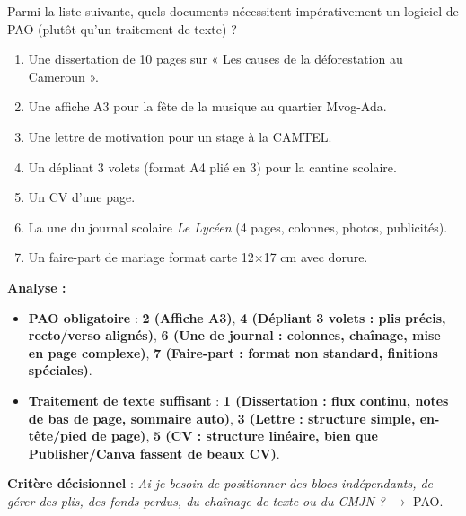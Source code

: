 \documentclass[11pt]{article}
\begin{document}
\begin{exemplebox}
Parmi la liste suivante, quels documents nécessitent impérativement un logiciel de PAO (plutôt qu'un traitement de texte) ?
\begin{enumerate}
    \item Une dissertation de 10 pages sur « Les causes de la déforestation au Cameroun ».
    \item Une affiche A3 pour la fête de la musique au quartier Mvog-Ada.
    \item Une lettre de motivation pour un stage à la CAMTEL.
    \item Un dépliant 3 volets (format A4 plié en 3) pour la cantine scolaire.
    \item Un CV d'une page.
    \item La une du journal scolaire \emph{Le Lycéen} (4 pages, colonnes, photos, publicités).
    \item Un faire-part de mariage format carte 12×17 cm avec dorure.
\end{enumerate}
\tcblower
\textbf{Analyse :}
\begin{itemize}
    \item \textbf{PAO obligatoire} : \textbf{2 (Affiche A3)}, \textbf{4 (Dépliant 3 volets : plis précis, recto/verso alignés)}, \textbf{6 (Une de journal : colonnes, chaînage, mise en page complexe)}, \textbf{7 (Faire-part : format non standard, finitions spéciales)}.
    \item \textbf{Traitement de texte suffisant} : \textbf{1 (Dissertation : flux continu, notes de bas de page, sommaire auto)}, \textbf{3 (Lettre : structure simple, en-tête/pied de page)}, \textbf{5 (CV : structure linéaire, bien que Publisher/Canva fassent de beaux CV)}.
\end{itemize}
\textbf{Critère décisionnel} : \emph{Ai-je besoin de positionner des blocs indépendants, de gérer des plis, des fonds perdus, du chaînage de texte ou du CMJN ?} $\rightarrow$ PAO.
\end{exemplebox}
\end{document}
